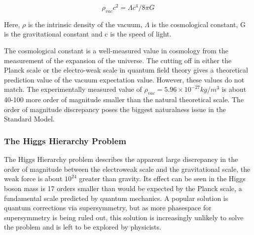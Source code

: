 \begin{equation}
    \rho_{vac}c^2=\Lambda c^4/8\pi G
\label{eq:cosmoconst}
\end{equation}

Here, $\rho$ is the intrinsic density of the vacuum, $\Lambda$ is the cosmological constant, G is the gravitational constant and c is the speed of light. 

The cosmological constant is a well-measured value in cosmology from the measurement of the expansion of the universe. The cutting off in either the Planck scale or the electro-weak scale in quantum field theory gives a theoretical prediction value of the vacuum expectation value. However, these values do not match. The experimentally measured value of $\rho_{vac}= 5.96 \times 10^{-27} kg/m^{3}$ \cite{2016Planck} is about 40-100 more order of magnitude smaller than the natural theoretical scale. The order of magnitude discrepancy poses the biggest naturalness issue in the Standard Model.





\subsubsection{The Higgs Hierarchy Problem}
The Higgs Hierarchy problem describes the apparent large discrepancy in the order of magnitude between the electroweak scale and the gravitational scale, the weak force is about $10^{24}$ greater than gravity. Its effect can be seen in the Higgs boson mass is 17 orders smaller than would be expected by the Planck scale, a fundamental scale predicted by quantum mechanics. 
A popular solution is quantum corrections via supersymmetry\cite{2018SUSY}, but as more phasespace for supersymmetry is being ruled out, this solution is increasingly unlikely to solve the problem and is left to be explored by physicists.

